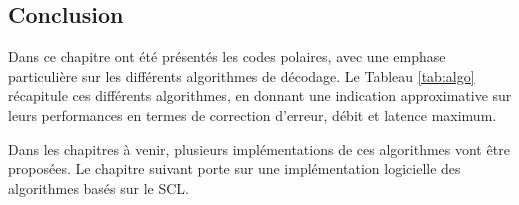 \subsection*{Conclusion}
 Dans ce chapitre ont été présentés les codes polaires, avec une emphase particulière sur les différents algorithmes de décodage. Le Tableau \ref{tab:algo} récapitule ces différents algorithmes, en donnant une indication approximative sur leurs performances en termes de correction d'erreur, débit et latence maximum.
  \begin{table}[t]
    \centering
    \caption{Tendances des différents algorithmes concernant leurs pouvoirs de correction, débits et latences}
    \label{tab:algo}
    {\small{}}
  \end{table}


Dans les chapitres à venir, plusieurs implémentations de ces algorithmes vont être proposées. Le chapitre suivant porte sur une implémentation logicielle des algorithmes basés sur le SCL.
